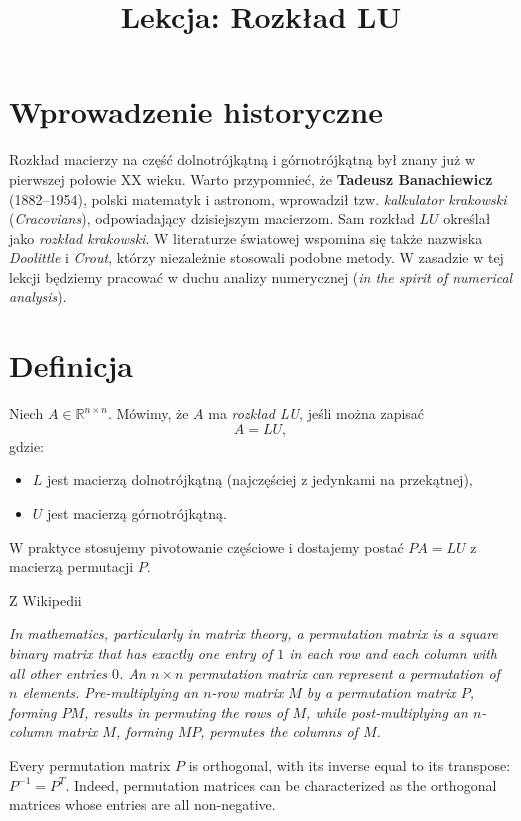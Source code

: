 \documentclass[12pt]{article}
\title{Lekcja: Rozkład LU}
\author{}
\date{}
\newcommand{\R}{\mathbb{R}}
\begin{document}
\maketitle

\section*{Wprowadzenie historyczne}
Rozkład macierzy na część dolnotrójkątną i górnotrójkątną był znany już w pierwszej połowie XX wieku.
Warto przypomnieć, że \textbf{Tadeusz Banachiewicz} (1882--1954), polski matematyk i astronom,
wprowadził tzw. \emph{kalkulator krakowski} (\emph{Cracovians}), odpowiadający dzisiejszym macierzom.
Sam rozkład $LU$ określał jako \emph{rozkład krakowski}. W literaturze światowej wspomina się
także nazwiska \emph{Doolittle} i \emph{Crout}, którzy niezależnie stosowali podobne metody.
 W zasadzie w tej lekcji będziemy pracować w duchu analizy numerycznej 
(\emph{in the spirit of numerical analysis}).

\section*{Definicja}
Niech $A \in \R^{n \times n}$. Mówimy, że $A$ ma \emph{rozkład LU}, jeśli można zapisać
\[
A = LU,
\]
gdzie:
\begin{itemize}[label=$\triangleright$]
\item $L$ jest macierzą dolnotrójkątną (najczęściej z jedynkami na przekątnej),
\item $U$ jest macierzą górnotrójkątną.
\end{itemize}
W praktyce stosujemy pivotowanie częściowe i dostajemy postać $PA=LU$ z macierzą permutacji $P$.


Z Wikipedii
{\it 
In mathematics, particularly in matrix theory,
 a permutation matrix is a square binary matrix that has exactly one entry of $1$ in each row and
 each column with all other entries $0$.  
  An $n\times n$ permutation matrix can represent a permutation of $n$ elements. Pre-multiplying an $n$-row matrix $M$ by a permutation matrix $P$, forming $PM$, results in permuting the rows of $M$, while post-multiplying an $n$-column matrix $M$, forming $MP$, permutes the columns of $M$.

Every permutation matrix $P$ is orthogonal, with its inverse equal to its transpose: 
$P^{-1}=P^T$. Indeed, permutation matrices can be characterized as the orthogonal matrices whose entries are all non-negative.}
\end{document}

